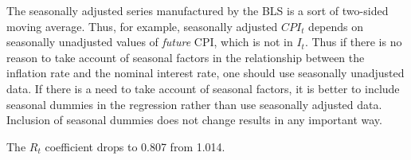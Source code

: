 \begin{answers}
The seasonally adjusted series manufactured by the BLS is a sort of two-sided
moving average. Thus, for example, seasonally adjusted $CPI_t$ depends on seasonally unadjusted values of \emph{future} CPI, which is not in $I_t$. Thus if there is no
reason to take account of seasonal factors in the relationship between the inflation rate and the nominal interest rate, one should use seasonally unadjusted
data. If there is a need to take account of seasonal factors, it is better to include
seasonal dummies in the regression rather than use seasonally adjusted data.
Inclusion of seasonal dummies does not change results in any important way.

The $R_t$ coefficient drops to 0.807 from 1.014.

\end{answers}
